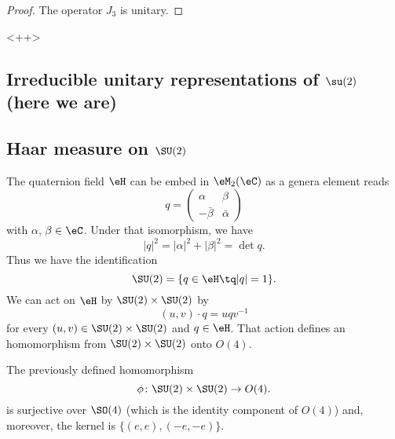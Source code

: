 \begin{proof}
    The operator \( J_3\) is unitary.
\end{proof}
<++>

\subsection{Irreducible unitary representations of \texorpdfstring{$ \su(2)$}{su(2)} (here we are)}
\label{SUBSECooHPQRooPvaRpJ}


					\subsection{Haar measure on \texorpdfstring{$\SU(2)$}{SU2}}

The quaternion field $\eH$ can be embed in $\eM_2(\eC)$ as a genera element reads
\begin{equation}
	q=
\begin{pmatrix}
  \alpha	&	\beta	\\
  -\bar\beta	&	\bar\alpha
\end{pmatrix}
\end{equation}
with $\alpha$, $\beta\in\eC$. Under that isomorphism, we have
\[
	| q |^2=| \alpha |^2+| \beta |^2=\det q.
\]
Thus we have the identification
\begin{equation}
	\SU(2)=\{ q\in\eH\tq | q |=1 \}.
\end{equation}
We can act on $\eH$ by $\SU(2)\times \SU(2)$ by
\begin{equation}
	(u,v)\cdot q=uqv^{-1}
\end{equation}
for every $(u,v)\in \SU(2)\times\SU(2)$ and $q\in\eH$. That action defines an homomorphism from $\SU(2)\times\SU(2)$ onto $O(4)$.

\begin{proposition}
The previously defined homomorphism
\[
	\phi\colon \SU(2)\times\SU(2)\to O(4).
\]
is surjective over $\SO(4)$ (which is the identity component of $O(4)$) and, moreover, the kernel is $\big\{  (e,e),(-e,-e) \big\}$.
\end{proposition}

